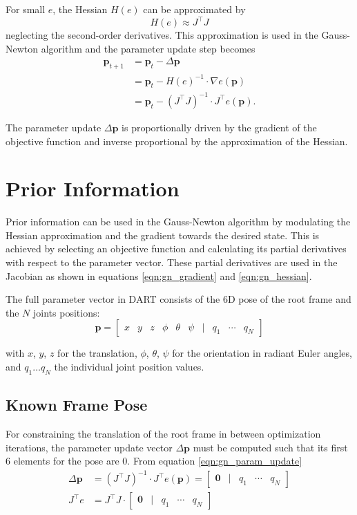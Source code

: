 For small $e$, the Hessian $H(e)$ can be approximated by
\begin{equation}
H(e) \approx J^\top J \label{eqn:gn_hessian}
\end{equation}
%
neglecting the second-order derivatives. This approximation is used in the Gauss-Newton algorithm and the parameter update step becomes
%
\begin{align}
\mathbf{p}_{t+1} &= \mathbf{p}_{t} - \Delta\mathbf{p} \\
&= \mathbf{p}_{t} - H(e)^{-1} \cdot \nabla e(\mathbf{p}) \\
&= \mathbf{p}_{t} - \left(J^\top J\right)^{-1} \cdot J^\top e(\mathbf{p}) \label{eqn:gn_param_update}.
\end{align}

The parameter update $\Delta\mathbf{p}$ is proportionally driven by the gradient of the objective function and inverse proportional by the approximation of the Hessian.


\section{Prior Information}

Prior information can be used in the Gauss-Newton algorithm by modulating the Hessian approximation and the gradient towards the desired state. This is achieved by selecting an objective function and calculating its partial derivatives with respect to the parameter vector. These partial derivatives are used in the Jacobian as shown in equations \ref{eqn:gn_gradient} and \ref{eqn:gn_hessian}.

The full parameter vector in DART consists of the 6D pose of the root frame and the $N$ joints positions:
\begin{equation}
\mathbf{p} = \begin{bmatrix}
x & y & z & \phi & \theta & \psi & | & q_1 & \cdots & q_N
\end{bmatrix}
\end{equation}

with $x$, $y$, $z$ for the translation, $\phi$, $\theta$, $\psi$ for the orientation in radiant Euler angles, and $q_1 \dots q_N$ the individual joint position values.


\subsection{Known Frame Pose}

For constraining the translation of the root frame in between optimization iterations, the parameter update vector $\Delta\mathbf{p}$ must be computed such that its first 6 elements for the pose are $0$. From equation \ref{eqn:gn_param_update}
\begin{align}
\Delta\mathbf{p} &= \left(J^\top J\right)^{-1} \cdot J^\top e(\mathbf{p}) = \begin{bmatrix}
\mathbf{0} & | & q_1 & \cdots & q_N
\end{bmatrix} \\
J^\top e &= J^\top J \cdot \begin{bmatrix}
\mathbf{0} & | & q_1 & \cdots & q_N
\end{bmatrix}
\end{align}

